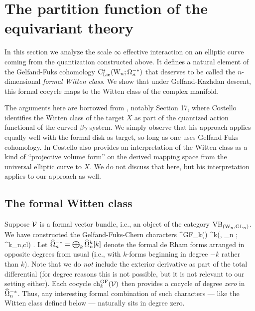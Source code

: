 \section{The partition function of the equivariant theory}

In this section we analyze the scale $\infty$ effective interaction on an elliptic curve coming from the quantization constructed above. 
It defines a natural element of the Gelfand-Fuks cohomology ${\rm C}_{{\rm Lie}}^*({{\rm W}_n} ; \Omega^{-*}_n)$ 
that deserves to be called the $n$-dimensional {\it formal Witten class}. 
We show that under Gelfand-Kazhdan descent, this formal cocycle maps to the Witten class of the complex manifold. 

\begin{rmk}
The arguments here are borrowed from \cite{WG2}, notably Section 17,
where Costello identifies the Witten class of the target $X$ 
as part of the quantized action functional of the curved $\beta\gamma$ system.
We simply observe that his approach applies equally well with the formal disk as target,
so long as one uses Gelfand-Fuks cohomology.
In \cite{WG2} Costello also provides an interpretation of the Witten class as a kind of ``projective volume form''
on the derived mapping space from the universal elliptic curve to $X$.
We do not discuss that here, but his interpretation applies to our approach as well.
\end{rmk}

\subsection{The formal Witten class}

Suppose $\mathcal{V}$ is a formal vector bundle, i.e., an object of the category ${\rm VB}_{({{\rm W}_n}, {\rm GL}_n)}$. 
We have constructed the Gelfand-Fuks-Chern characters
\ben
\ch^{\rm GF}_k(\cV) \in \clie^k(\Vect, \GL_n ; \hOmega^k_{n,cl}) .
\een
Let $\widehat{\Omega}^{-*}_n = \bigoplus_{k} \widehat{\Omega}^k_n [k]$ denote the formal de Rham forms 
arranged in opposite degrees from usual (i.e., with $k$-forms beginning in degree $-k$ rather than $k$).
Note that we do {\em not} include the exterior derivative as part of the total differential
(for degree reasons this is not possible, but it is not relevant to our setting either).
Each cocycle ${\rm ch}^{\rm GF}_k(\mathcal{V})$ then provides a cocycle of degree \emph{zero} in $\widehat{\Omega}^{-*}_n$.
Thus, any interesting formal combination of such characters --- like the Witten class defined below --- naturally sits in degree zero.

